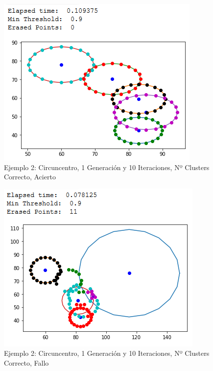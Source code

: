 \documentclass[conference,a4paper]{IEEEtran}
\begin{document}
\begin{figure}[H]
\centering
\includegraphics[scale=0.65]{Experimentacion/Ejemplo2/ej2_c_1_10_cc_correct}
\caption{Ejemplo 2: Circuncentro, 1 Generación y 10 Iteraciones,  Nº Clusters Correcto, Acierto\\}
\end{figure}

\begin{figure}[H]
\centering
\includegraphics[scale=0.65]{Experimentacion/Ejemplo2/ej2_c_1_10_cc_wrong}
\caption{Ejemplo 2: Circuncentro, 1 Generación y 10 Iteraciones,  Nº Clusters Correcto, Fallo\\}
\end{figure}
\end{document}
